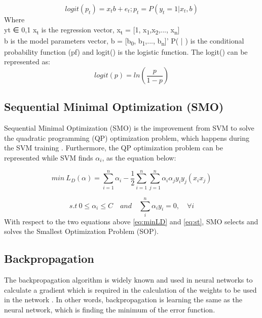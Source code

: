 \documentclass[review]{elsarticle}
\begin{document}
 	\begin{equation}
 	logit(p_t) =x_tb+e_t; p_t=P(y_t =1|x_t,b)
 	\label{eq:logit_PT}
 	\end{equation}
 	Where \\
 	yt ∈ {0,1} 
 	x\textsubscript{t} is the regression vector, x\textsubscript{t} = [1, x\textsubscript{1},x\textsubscript{2},..., x\textsubscript{n}]\\
 	b is the model parameters vector, b = [b\textsubscript{0}, b\textsubscript{1},..., b\textsubscript{n}]’
 	P( | )  is the conditional probability function (pf) and 
 	logit() is the logistic function. The logit() can be represented as: 
 	\begin{equation}
 	logit(p)=ln(\dfrac{p}{1-p})
 	\label{eq:logit_P}
 	\end{equation}
	
\subsection{Sequential Minimal Optimization (SMO)}
\label{subsec:SMO}
Sequential Minimal Optimization (SMO) is the improvement from SVM to solve the quadratic programming (QP) optimization problem, which happens during the SVM training \cite{Platt1998}. Furthermore, the QP optimization problem can be represented while SVM finds $\alpha_i$, as the equation below:

 	\begin{equation}
 	min \ L_D(\alpha)= \sum_{i=1}^n \alpha_i -\dfrac{1}{2}\sum_{i=1}^n \sum_{j=1}^n \alpha_i \alpha_j y_iy_j(x_ix_j)
 	\label{eq:minLD}
 	\end{equation}
 	
 	\begin{equation}
 	s.t \ 0 \leq \alpha_i \leq C \quad  and \quad \sum_i^n \alpha_i y_i =0, \quad \forall i
    \label{eq:st}
 	\end{equation}
 	With respect to the two equations above \ref{eq:minLD} and \ref{eq:st}, SMO selects and solves the Smallest Optimization Problem (SOP).
	
\subsection{Backpropagation}
\label{subsec:Back}
The backpropagation algorithm is widely known and used in neural networks to calculate a gradient which is required in the calculation of the weights to be used in the network \cite{Kelley1960}. In other words, backpropagation is learning the same as the neural network, which is finding the minimum of the error function.
\end{document}
